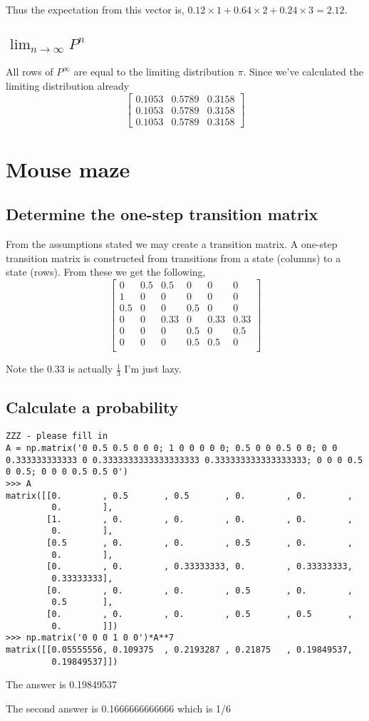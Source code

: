 \documentclass{article}
\begin{document}
Thus the expectation from this vector is,
$0.12 \times 1 + 0.64 \times 2 + 0.24 \times 3 = 2.12$.

\subsection{$\lim_{n \to \infty} P^n$}
All rows of $P^\infty$ are equal to the limiting distribution $\pi$.
Since we've calculated the limiting distribution already
\[
    \begin{bmatrix}
        0.1053 & 0.5789 & 0.3158 \\
        0.1053 & 0.5789 & 0.3158 \\
        0.1053 & 0.5789 & 0.3158
    \end{bmatrix}
\]

\section{Mouse maze}
\subsection{Determine the one-step transition matrix}
From the assumptions stated we may create a transition matrix.
A one-step transition matrix is constructed from transitions
from a state (columns) to a state (rows). From these we get the following,
\[
    \begin{bmatrix}
        0 & 0.5 & 0.5 & 0 & 0 & 0 \\
        1 & 0 & 0 & 0 & 0 & 0 \\
        0.5 & 0 & 0 & 0.5 & 0 & 0 \\
        0 & 0 & 0.33 & 0 & 0.33 & 0.33 \\
        0 & 0 & 0 & 0.5 & 0 & 0.5 \\
        0 & 0 & 0 & 0.5 & 0.5 & 0 \\
    \end{bmatrix}
\]

Note the $0.33$ is actually $\frac{1}{3}$ I'm just lazy.

\subsection{Calculate a probability}
\begin{verbatim}
ZZZ - please fill in
A = np.matrix('0 0.5 0.5 0 0 0; 1 0 0 0 0 0; 0.5 0 0 0.5 0 0; 0 0 0.333333333333 0 0.3333333333333333333 0.333333333333333333; 0 0 0 0.5 0 0.5; 0 0 0 0.5 0.5 0')
>>> A
matrix([[0.        , 0.5       , 0.5       , 0.        , 0.        ,
         0.        ],
        [1.        , 0.        , 0.        , 0.        , 0.        ,
         0.        ],
        [0.5       , 0.        , 0.        , 0.5       , 0.        ,
         0.        ],
        [0.        , 0.        , 0.33333333, 0.        , 0.33333333,
         0.33333333],
        [0.        , 0.        , 0.        , 0.5       , 0.        ,
         0.5       ],
        [0.        , 0.        , 0.        , 0.5       , 0.5       ,
         0.        ]])
>>> np.matrix('0 0 0 1 0 0')*A**7
matrix([[0.05555556, 0.109375  , 0.2193287 , 0.21875   , 0.19849537,
         0.19849537]])
\end{verbatim}

The answer is 0.19849537

The second answer is 0.1666666666666 which is 1/6
\end{document}
